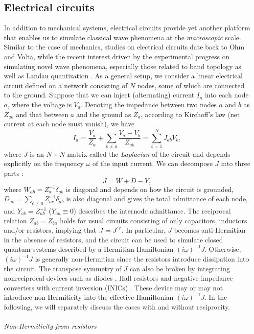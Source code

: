 \documentclass{tADP2e}
\theoremstyle{plain}
\theoremstyle{plain}
\theoremstyle{definition}
\begin{document}
\subsection{Electrical circuits}\label{sec:3ele}
In addition to mechanical systems, electrical circuits provide yet another  platform that enables us to simulate classical wave phenomena at the \emph{macroscopic} scale. Similar to the case of mechanics, studies on electrical circuits date  back to Ohm and Volta, while the recent interest  driven by the experimental progress on simulating novel wave phenomena, especially those related to band topology \cite{NJ15,CWP18,SI18} as well as Landau quantization \cite{ZXX20}. As a general setup, we consider a linear electrical circuit \cite{AVV15} defined on a network consisting of $N$ nodes, some of which are connected to the ground. Suppose that we can inject (alternating) current $I_a$ into each node $a$, where the voltage is $V_a$. Denoting the impedance between two nodes $a$ and $b$ as $Z_{ab}$ and that between $a$ and the ground as $Z_a$, according to Kirchoff's law \cite{YNJ09} (net current at each node must vanish), we have
\begin{equation}
I_a=\frac{V_a}{Z_a}+\sum_{b\neq a}\frac{V_a-V_b}{Z_{ab}}=\sum^N_{b=1} J_{ab} V_b,
\label{IJV}
\end{equation}
where $J$ is an $N\times N$ matrix called the \emph{Laplacian} of the circuit and depends explicitly on the frequency $\omega$ of the input current. We can decompose $J$ into three parts \cite{CHL18}:
\begin{equation}
J=W+D-Y,
\end{equation}  
where $W_{ab}=Z_a^{-1}\delta_{ab}$ is diagonal and depends on how the circuit is grounded, $D_{ab}=\sum_{c\neq a}Z_{ac}^{-1}\delta_{ab}$ is also diagonal and gives the total admittance of each node, and $Y_{ab}=Z_{ab}^{-1}$ ($Y_{aa}\equiv0$) describes the internode admittance. The reciprocal relation $Z_{ab}=Z_{ba}$ holds for usual circuits consisting of only capacitors, inductors and/or resistors, implying that $J=J^{\rm T}$. In particular, $J$ becomes anti-Hermitian in the absence of resistors, and the circuit can be used to simulate closed quantum systems described by a Hermitian Hamiltonian $(i\omega)^{-1}J$. Otherwise, $(i\omega)^{-1}J$ is generally non-Hermitian since the resistors introduce dissipation into the circuit. The transpose symmetry of $J$ can also be broken by integrating nonreciprocal devices such as diodes \cite{EM19}, Hall resistors \cite{HR19} and negative impedance converters with current inversion (INICs) \cite{WKC09}. These device may or may not introduce non-Hermiticity into the effective Hamiltonian $(i\omega)^{-1}J$. In the following, we will separately discuss the cases with and without reciprocity. 
\\ \\ {\it Non-Hermiticity from resistors}
\end{document}

